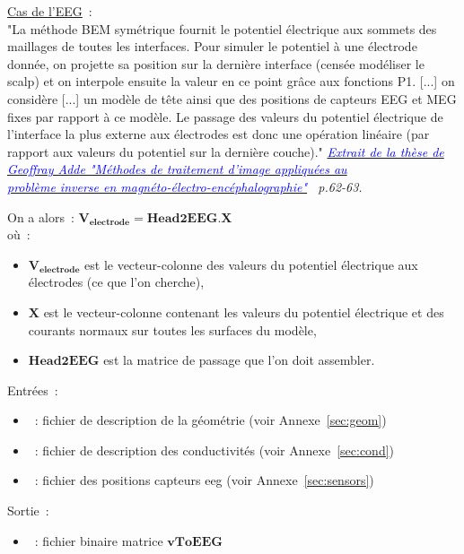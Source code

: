 \checkItem \underline{Cas de l'EEG}~:\\
"La méthode BEM symétrique fournit le potentiel électrique aux sommets des maillages de toutes les interfaces. Pour simuler le
potentiel à une électrode donnée, on projette sa position sur la dernière interface (censée modéliser le scalp) et on interpole
ensuite la valeur en ce point grâce aux fonctions P1.  [...] on considère [...] un modèle de tête ainsi que des positions de
capteurs EEG et MEG fixes par rapport à ce modèle. Le passage des valeurs du potentiel électrique de l'interface la plus externe
aux électrodes est donc une opération linéaire (par rapport aux valeurs du potentiel sur la dernière couche)."
\emph{\underline{\textcolor{blue}{Extrait de la thèse de Geoffray Adde "Méthodes de traitement d'image appliquées au}}}\\
\emph{\underline{\textcolor{blue}{problème inverse en magnéto-électro-encéphalographie"}}  p.62-63.}

\medskip

\noindent
On a alors~: $\mathbf{V_{electrode}} = \mathbf{Head2EEG} . \mathbf{X}$\\
où~:\\ 
\begin{itemize}
    \item $\mathbf{V_{electrode}}$ est le vecteur-colonne des valeurs du potentiel électrique aux électrodes (ce que l'on cherche),
    \item $\mathbf{X}$ est le vecteur-colonne contenant les valeurs du potentiel électrique et des courants normaux sur toutes les surfaces du modèle,
    \item $\mathbf{Head2EEG}$ est la matrice de passage que l'on doit assembler.
\end{itemize}

\bigskip

\noindent
Entrées~:
\begin{itemize}
    \item {}~: fichier de description de la géométrie (voir Annexe~\ref{sec:geom})
    \item {}~: fichier de description des conductivités (voir Annexe~\ref{sec:cond})
    \item {}~: fichier des positions capteurs eeg (voir Annexe~\ref{sec:sensors})
\end{itemize}
Sortie~:
\begin{itemize}
    \item {}~: fichier binaire matrice $\mathbf{vToEEG}$
\end{itemize}

